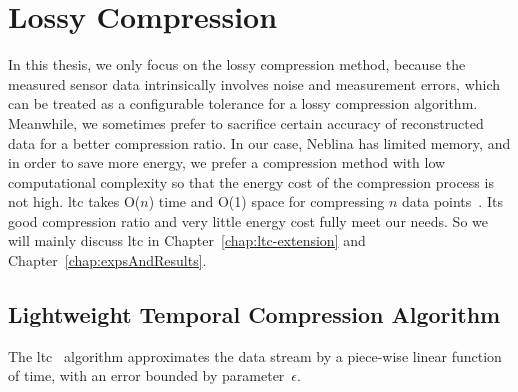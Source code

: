 \section{Lossy Compression}
\label{sec:lossy}

In this thesis, we only focus on the lossy compression method, because the
measured sensor data intrinsically involves noise and measurement errors, which
can be treated as a configurable tolerance for a lossy compression algorithm.
Meanwhile, we sometimes prefer to sacrifice certain accuracy of reconstructed
data for a better compression ratio. In our case, Neblina has limited memory,
and in order to save more energy, we prefer a compression method with low
computational complexity so that the energy cost of the compression process is
not high. \acrshort{ltc}  takes O($n$) time and O(1) space for compressing $n$
data points~\cite{schoellhammer2004lightweight}. Its good compression ratio and
very little energy cost fully meet our needs. So we will mainly discuss
\acrshort{ltc} in Chapter~\ref{chap:ltc-extension} and
Chapter~\ref{chap:expsAndResults}. 
\subsection{Lightweight Temporal Compression Algorithm}
\label{sec:ltc}

The \acrfull{ltc}~\cite{schoellhammer2004lightweight}
algorithm approximates the data stream by a piece-wise linear function of time,
with an error bounded by parameter~$\epsilon$.

